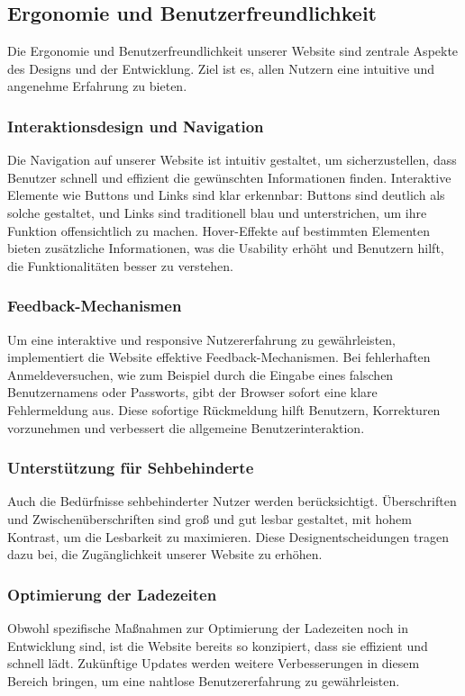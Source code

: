 \subsection{Ergonomie und Benutzerfreundlichkeit}

Die Ergonomie und Benutzerfreundlichkeit unserer Website sind zentrale Aspekte des Designs und der Entwicklung. Ziel ist es, allen Nutzern eine intuitive und angenehme Erfahrung zu bieten.

\subsubsection{Interaktionsdesign und Navigation}
Die Navigation auf unserer Website ist intuitiv gestaltet, um sicherzustellen, dass Benutzer schnell und effizient die gewünschten Informationen finden. Interaktive Elemente wie Buttons und Links sind klar erkennbar: Buttons sind deutlich als solche gestaltet, und Links sind traditionell blau und unterstrichen, um ihre Funktion offensichtlich zu machen. Hover-Effekte auf bestimmten Elementen bieten zusätzliche Informationen, was die Usability erhöht und Benutzern hilft, die Funktionalitäten besser zu verstehen.

\subsubsection{Feedback-Mechanismen}
Um eine interaktive und responsive Nutzererfahrung zu gewährleisten, implementiert die Website effektive Feedback-Mechanismen. Bei fehlerhaften Anmeldeversuchen, wie zum Beispiel durch die Eingabe eines falschen Benutzernamens oder Passworts, gibt der Browser sofort eine klare Fehlermeldung aus. Diese sofortige Rückmeldung hilft Benutzern, Korrekturen vorzunehmen und verbessert die allgemeine Benutzerinteraktion.

\subsubsection{Unterstützung für Sehbehinderte}
Auch die Bedürfnisse sehbehinderter Nutzer werden berücksichtigt. Überschriften und Zwischenüberschriften sind groß und gut lesbar gestaltet, mit hohem Kontrast, um die Lesbarkeit zu maximieren. Diese Designentscheidungen tragen dazu bei, die Zugänglichkeit unserer Website zu erhöhen.

\subsubsection{Optimierung der Ladezeiten}
Obwohl spezifische Maßnahmen zur Optimierung der Ladezeiten noch in Entwicklung sind, ist die Website bereits so konzipiert, dass sie effizient und schnell lädt. Zukünftige Updates werden weitere Verbesserungen in diesem Bereich bringen, um eine nahtlose Benutzererfahrung zu gewährleisten.

